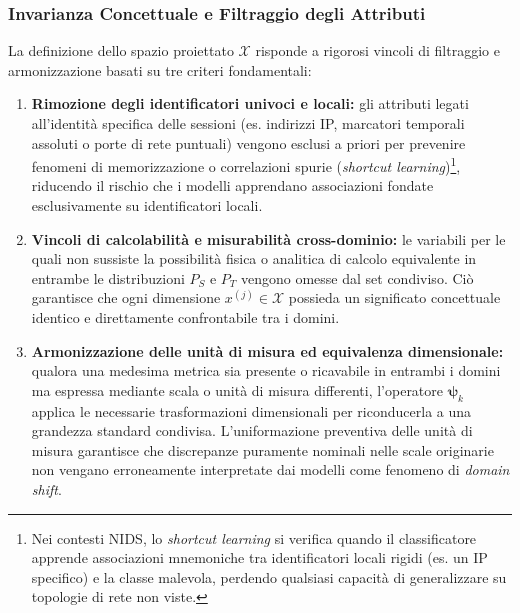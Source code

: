 \subsubsection{Invarianza Concettuale e Filtraggio degli Attributi}
\label{subsubsec:invarianza_filtraggio}
La definizione dello spazio proiettato $\mathcal{X}$ risponde a rigorosi vincoli di filtraggio e armonizzazione basati su tre criteri fondamentali:
\begin{enumerate}
    \item \textbf{Rimozione degli identificatori univoci e locali:} gli attributi legati all'identità specifica delle sessioni (es. indirizzi IP, marcatori temporali assoluti o porte di rete puntuali) vengono esclusi a priori per prevenire fenomeni di memorizzazione o correlazioni spurie (\textit{shortcut learning})\footnote{Nei contesti NIDS, lo \textit{shortcut learning} si verifica quando il classificatore apprende associazioni mnemoniche tra identificatori locali rigidi (es. un IP specifico) e la classe malevola, perdendo qualsiasi capacità di generalizzare su topologie di rete non viste.}, riducendo il rischio che i modelli apprendano associazioni fondate esclusivamente su identificatori locali.
    \item \textbf{Vincoli di calcolabilità e misurabilità cross-dominio:} le variabili per le quali non sussiste la possibilità fisica o analitica di calcolo equivalente in entrambe le distribuzioni $P_S$ e $P_T$ vengono omesse dal set condiviso. Ciò garantisce che ogni dimensione $x^{(j)} \in \mathcal{X}$ possieda un significato concettuale identico e direttamente confrontabile tra i domini.
    \item \textbf{Armonizzazione delle unità di misura ed equivalenza dimensionale:} qualora una medesima metrica sia presente o ricavabile in entrambi i domini ma espressa mediante scala o unità di misura differenti, l'operatore $\boldsymbol{\psi}_k$ applica le necessarie trasformazioni dimensionali per riconducerla a una grandezza standard condivisa. L'uniformazione preventiva delle unità di misura garantisce che discrepanze puramente nominali nelle scale originarie non vengano erroneamente interpretate dai modelli come fenomeno di \textit{domain shift}.
\end{enumerate}

